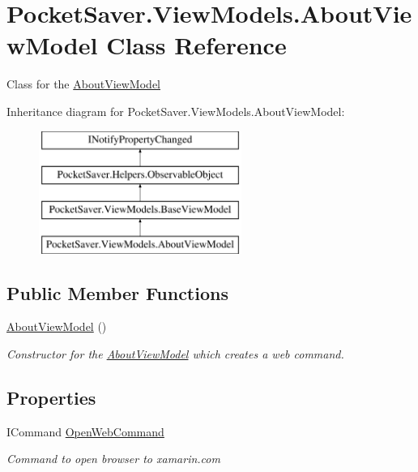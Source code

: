 \hypertarget{class_pocket_saver_1_1_view_models_1_1_about_view_model}{}\section{Pocket\+Saver.\+View\+Models.\+About\+View\+Model Class Reference}
\label{class_pocket_saver_1_1_view_models_1_1_about_view_model}


Class for the \hyperlink{class_pocket_saver_1_1_view_models_1_1_about_view_model}{About\+View\+Model}  


Inheritance diagram for Pocket\+Saver.\+View\+Models.\+About\+View\+Model\+:\begin{figure}[H]
\begin{center}
\leavevmode
\includegraphics[height=4.000000cm]{class_pocket_saver_1_1_view_models_1_1_about_view_model}
\end{center}
\end{figure}
\subsection*{Public Member Functions}
\begin{DoxyCompactItemize}
\item 
\hyperlink{class_pocket_saver_1_1_view_models_1_1_about_view_model_a0af1bc18750501770811c7c4d46f342c}{About\+View\+Model} ()
\begin{DoxyCompactList}\small\item\em Constructor for the \hyperlink{class_pocket_saver_1_1_view_models_1_1_about_view_model}{About\+View\+Model} which creates a web command. \end{DoxyCompactList}\end{DoxyCompactItemize}
\subsection*{Properties}
\begin{DoxyCompactItemize}
\item 
I\+Command \hyperlink{class_pocket_saver_1_1_view_models_1_1_about_view_model_a05bca2ba82a3e0d0b231d177f3990e66}{Open\+Web\+Command}
\begin{DoxyCompactList}\small\item\em Command to open browser to xamarin.\+com \end{DoxyCompactList}\end{DoxyCompactItemize}
